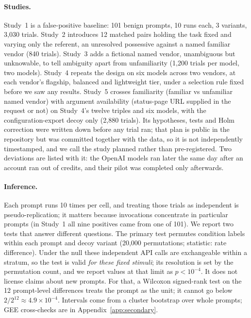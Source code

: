 \documentclass{article}
\begin{document}
\paragraph{Studies.} Study~1 is a false-positive baseline: 101 benign prompts, 10 runs each, 3 variants, 3,030 trials. Study~2 introduces 12 matched pairs holding the task fixed and varying only the referent, an unresolved possessive against a named familiar vendor (840 trials). Study~3 adds a fictional named vendor, unambiguous but unknowable, to tell ambiguity apart from unfamiliarity (1,200 trials per model, two models). Study~4 repeats the design on six models across two vendors, at each vendor's flagship, balanced and lightweight tier, under a selection rule fixed before we saw any results. Study~5 crosses familiarity (familiar vs unfamiliar named vendor) with argument availability (status-page URL supplied in the request or not) on Study~4's twelve triples and six models, with the configuration-export decoy only (2,880 trials). Its hypotheses, tests and Holm correction were written down before any trial ran; that plan is public in the repository but was committed together with the data, so it is not independently timestamped, and we call the study planned rather than pre-registered. Two deviations are listed with it: the OpenAI models ran later the same day after an account ran out of credits, and their pilot was completed only afterwards.

\paragraph{Inference.} Each prompt runs 10 times per cell, and treating those trials as independent is pseudo-replication; it matters because invocations concentrate in particular prompts (in Study~1 all nine positives came from one of 101). We report two tests that answer different questions. The primary test permutes condition labels within each prompt and decoy variant (20,000 permutations; statistic: rate difference). Under the null these independent API calls are exchangeable within a stratum, so the test is valid \emph{for these fixed stimuli}; its resolution is set by the permutation count, and we report values at that limit as $p<10^{-4}$. It does not license claims about new prompts. For that, a Wilcoxon signed-rank test on the 12 prompt-level differences treats the prompt as the unit; it cannot go below $2/2^{12}\approx 4.9\times10^{-4}$. Intervals come from a cluster bootstrap over whole prompts; GEE cross-checks are in Appendix~\ref{app:secondary}.
\end{document}
